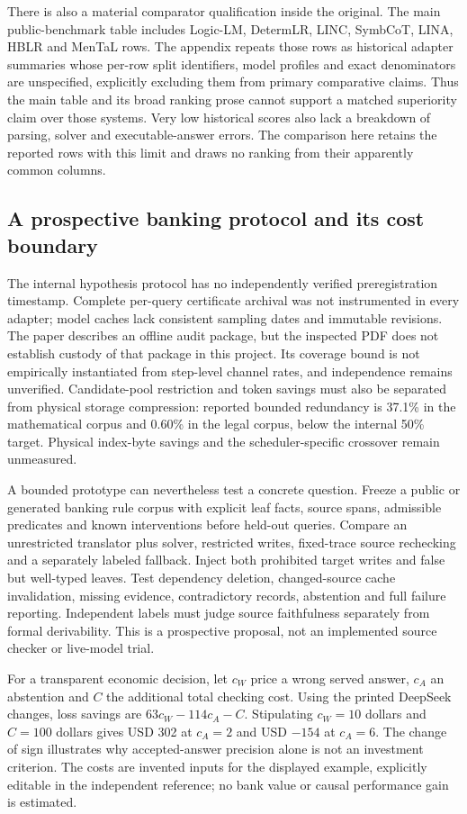 There is also a material comparator qualification inside the original.
The main public-benchmark table includes Logic-LM, DetermLR, LINC, SymbCoT,
LINA, HBLR and MenTaL rows. The appendix repeats those rows as historical
adapter summaries whose per-row split identifiers, model profiles and exact
denominators are unspecified, explicitly excluding them from primary
comparative claims. Thus the main table and its broad ranking prose cannot
support a matched superiority claim over those systems. Very low historical
scores also lack a breakdown of parsing, solver and executable-answer errors.
The comparison here retains the reported rows with this limit and draws no
ranking from their apparently common columns.
\citep{exec23_controlled_writes_paper}

\subsection{A prospective banking protocol and its cost boundary}
\label{exec23:controlled-writes-decision}
The internal hypothesis protocol has no independently verified preregistration
timestamp. Complete per-query certificate archival was not instrumented in
every adapter; model caches lack consistent sampling dates and immutable
revisions. The paper describes an offline audit package, but the inspected
PDF does not establish custody of that package in this project. Its coverage
bound is not empirically instantiated from step-level channel rates, and
independence remains unverified. Candidate-pool restriction and token savings
must also be separated from physical storage compression: reported bounded
redundancy is 37.1\% in the mathematical corpus and 0.60\% in the legal
corpus, below the internal 50\% target. Physical index-byte savings and the
scheduler-specific crossover remain unmeasured.
\citep{exec23_controlled_writes_paper}

A bounded prototype can nevertheless test a concrete question. Freeze a
public or generated banking rule corpus with explicit leaf facts, source
spans, admissible predicates and known interventions before held-out queries.
Compare an unrestricted translator plus solver, restricted writes, fixed-trace
source rechecking and a separately labeled fallback. Inject both prohibited
target writes and false but well-typed leaves. Test dependency deletion,
changed-source cache invalidation, missing evidence, contradictory records,
abstention and full failure reporting. Independent labels must judge source
faithfulness separately from formal derivability. This is a prospective
proposal, not an implemented source checker or live-model trial.
\citep{exec23_controlled_writes_paper}

For a transparent economic decision, let $c_W$ price a wrong served answer,
$c_A$ an abstention and $C$ the additional total checking cost. Using the
printed DeepSeek changes, loss savings are $63c_W-114c_A-C$. Stipulating
$c_W=10$ dollars and $C=100$ dollars gives USD 302 at $c_A=2$ and
USD $-154$ at $c_A=6$. The change of sign illustrates why accepted-answer
precision alone is not an investment criterion. The costs are invented
inputs for the displayed example, explicitly editable in the independent
reference; no bank value or causal performance gain is estimated.
\citep{exec23_controlled_writes_reference}
